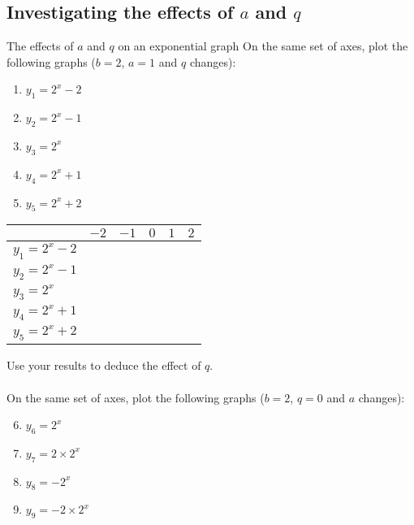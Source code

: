    

\subsection*{Investigating the effects of $a$ and $q$}
\begin{Investigation}{The effects of $a$ and $q$ on an exponential graph}
On the same set of axes, plot the following graphs ($b=2$, $a=1$ and $q$ changes):
\begin{enumerate}[noitemsep, label=\textbf{\arabic*}. ] 
\item $y_1=2^{x}-2$
\item $y_2=2^{x}-1$
\item $y_3=2^{x}$
\item $y_4=2^{x}+1$
\item $y_5=2^{x}+2$
\end{enumerate}

\begin{table}[H]
\begin{center}
\begin{tabular}{|l|c|c|c|c|c|}
\hline
   &  $-2$ & $-1$ & $0$ & $1$ & $2$ 
\\ \hline
$y_1=2^{x}-2$& \hspace{1cm} & \hspace{1cm} & \hspace{1cm} & \hspace{1cm} & \hspace{1cm}
\\ \hline
 $y_2=2^{x}-1$&  &&&&
\\ \hline
$y_3=2^{x}$&  &&&&
\\ \hline
$y_4=2^{x}+1$&  &&&&
\\ \hline
$y_5=2^{x}+2$&  &&&&
\\ \hline
\end{tabular}
\end{center}
\end{table}
Use your results to deduce the effect of $q$.
\\
\\
On the same set of axes, plot the following graphs ($b=2$, $q=0$ and $a$ changes):
\begin{enumerate}[noitemsep, label=\textbf{\arabic*}. ] 
\setcounter{enumi}{5}
\item $y_6=2^{x}$
\item $y_7=2 \times 2^{x}$
\item $y_8=-2^{x}$
\item $y_9=-2 \times 2^{x}$
\end{enumerate}


\end{Investigation}
